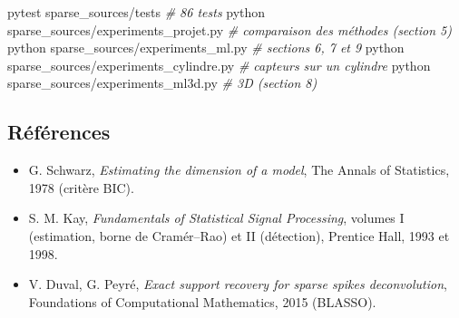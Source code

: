 \documentclass[
  french,
]{article}
\newenvironment{Shaded}{}{}
\newcommand{\CommentTok}[1]{\textcolor[rgb]{0.38,0.63,0.69}{\textit{#1}}}
\newcommand{\ExtensionTok}[1]{#1}
\newcommand{\NormalTok}[1]{#1}
\providecommand{\tightlist}{%
  \setlength{\itemsep}{0pt}\setlength{\parskip}{0pt}}
\begin{document}
\begin{Shaded}
\begin{Highlighting}[]
\ExtensionTok{pytest}\NormalTok{ sparse\_sources/tests                    }\CommentTok{\# 86 tests}
\ExtensionTok{python}\NormalTok{ sparse\_sources/experiments\_projet.py    }\CommentTok{\# comparaison des méthodes (section 5)}
\ExtensionTok{python}\NormalTok{ sparse\_sources/experiments\_ml.py        }\CommentTok{\# sections 6, 7 et 9}
\ExtensionTok{python}\NormalTok{ sparse\_sources/experiments\_cylindre.py  }\CommentTok{\# capteurs sur un cylindre}
\ExtensionTok{python}\NormalTok{ sparse\_sources/experiments\_ml3d.py      }\CommentTok{\# 3D (section 8)}
\end{Highlighting}
\end{Shaded}

\subsection{Références}\label{ruxe9fuxe9rences}

\begin{itemize}
\tightlist
\item
  G. Schwarz, \emph{Estimating the dimension of a model}, The Annals of
  Statistics, 1978 (critère BIC).
\item
  S. M. Kay, \emph{Fundamentals of Statistical Signal Processing},
  volumes I (estimation, borne de Cramér--Rao) et II (détection),
  Prentice Hall, 1993 et 1998.
\item
  V. Duval, G. Peyré, \emph{Exact support recovery for sparse spikes
  deconvolution}, Foundations of Computational Mathematics, 2015
  (BLASSO).
\end{itemize}
\end{document}
